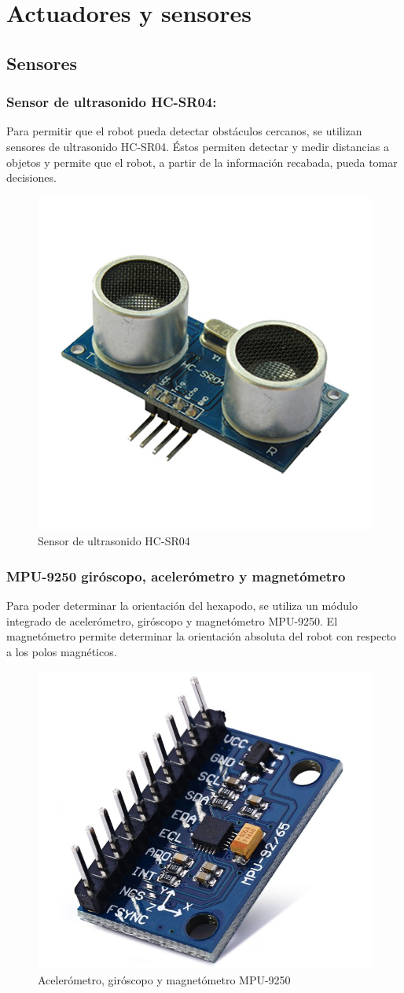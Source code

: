 \documentclass{article}
\begin{document}
\setcounter{secnumdepth}{0}
\section{Actuadores y sensores}
\subsection{Sensores}

\subsubsection{Sensor de ultrasonido HC-SR04:}

Para permitir que el robot pueda detectar obstáculos cercanos, se utilizan sensores de ultrasonido HC-SR04. Éstos permiten detectar y medir distancias  a objetos y permite que el robot, a partir de la información recabada, pueda tomar decisiones.

\begin{figure}[!h]
  \centering
  \includegraphics[width=0.4\linewidth]{HC.jpg}
  \caption{Sensor de ultrasonido HC-SR04}
\end{figure}

\subsubsection{MPU-9250 giróscopo, acelerómetro y magnetómetro}

Para poder determinar la orientación del hexapodo, se utiliza un módulo integrado de acelerómetro, giróscopo y magnetómetro MPU-9250. El magnetómetro permite determinar la orientación absoluta del robot con respecto a los polos magnéticos. 

\begin{figure}[!h]
  \centering
  \includegraphics[width=0.4\linewidth]{MPU.jpg}
  \caption{Acelerómetro, giróscopo y magnetómetro MPU-9250}
\end{figure}
\end{document}
